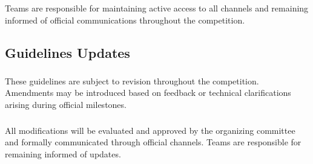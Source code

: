 \subsubsection{}
Teams are responsible for maintaining active access to all channels and remaining informed of official communications throughout the competition.

\subsection{Guidelines Updates}

\subsubsection{}
These guidelines are subject to revision throughout the competition. Amendments may be introduced based on feedback or technical clarifications arising during official milestones.

\subsubsection{}
All modifications will be evaluated and approved by the organizing committee and formally communicated through official channels. Teams are responsible for remaining informed of updates.